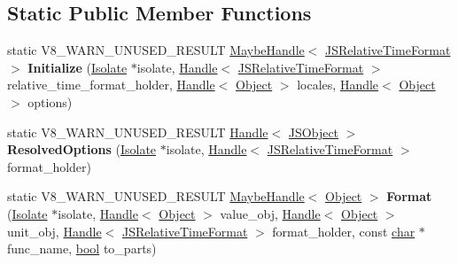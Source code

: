 \subsection*{Static Public Member Functions}
\begin{DoxyCompactItemize}
\item 
\mbox{\label{classv8_1_1internal_1_1JSRelativeTimeFormat_a203a42a386b944dc99ace43de6063f83}} 
static V8\+\_\+\+W\+A\+R\+N\+\_\+\+U\+N\+U\+S\+E\+D\+\_\+\+R\+E\+S\+U\+LT \mbox{\hyperlink{classv8_1_1internal_1_1MaybeHandle}{Maybe\+Handle}}$<$ \mbox{\hyperlink{classv8_1_1internal_1_1JSRelativeTimeFormat}{J\+S\+Relative\+Time\+Format}} $>$ {\bfseries Initialize} (\mbox{\hyperlink{classv8_1_1internal_1_1Isolate}{Isolate}} $\ast$isolate, \mbox{\hyperlink{classv8_1_1internal_1_1Handle}{Handle}}$<$ \mbox{\hyperlink{classv8_1_1internal_1_1JSRelativeTimeFormat}{J\+S\+Relative\+Time\+Format}} $>$ relative\+\_\+time\+\_\+format\+\_\+holder, \mbox{\hyperlink{classv8_1_1internal_1_1Handle}{Handle}}$<$ \mbox{\hyperlink{classv8_1_1internal_1_1Object}{Object}} $>$ locales, \mbox{\hyperlink{classv8_1_1internal_1_1Handle}{Handle}}$<$ \mbox{\hyperlink{classv8_1_1internal_1_1Object}{Object}} $>$ options)
\item 
\mbox{\label{classv8_1_1internal_1_1JSRelativeTimeFormat_aa114b19274387be61a40faa0a96ef961}} 
static V8\+\_\+\+W\+A\+R\+N\+\_\+\+U\+N\+U\+S\+E\+D\+\_\+\+R\+E\+S\+U\+LT \mbox{\hyperlink{classv8_1_1internal_1_1Handle}{Handle}}$<$ \mbox{\hyperlink{classv8_1_1internal_1_1JSObject}{J\+S\+Object}} $>$ {\bfseries Resolved\+Options} (\mbox{\hyperlink{classv8_1_1internal_1_1Isolate}{Isolate}} $\ast$isolate, \mbox{\hyperlink{classv8_1_1internal_1_1Handle}{Handle}}$<$ \mbox{\hyperlink{classv8_1_1internal_1_1JSRelativeTimeFormat}{J\+S\+Relative\+Time\+Format}} $>$ format\+\_\+holder)
\item 
\mbox{\label{classv8_1_1internal_1_1JSRelativeTimeFormat_a5919f5b4f9aed00af7ec1f83c7717faf}} 
static V8\+\_\+\+W\+A\+R\+N\+\_\+\+U\+N\+U\+S\+E\+D\+\_\+\+R\+E\+S\+U\+LT \mbox{\hyperlink{classv8_1_1internal_1_1MaybeHandle}{Maybe\+Handle}}$<$ \mbox{\hyperlink{classv8_1_1internal_1_1Object}{Object}} $>$ {\bfseries Format} (\mbox{\hyperlink{classv8_1_1internal_1_1Isolate}{Isolate}} $\ast$isolate, \mbox{\hyperlink{classv8_1_1internal_1_1Handle}{Handle}}$<$ \mbox{\hyperlink{classv8_1_1internal_1_1Object}{Object}} $>$ value\+\_\+obj, \mbox{\hyperlink{classv8_1_1internal_1_1Handle}{Handle}}$<$ \mbox{\hyperlink{classv8_1_1internal_1_1Object}{Object}} $>$ unit\+\_\+obj, \mbox{\hyperlink{classv8_1_1internal_1_1Handle}{Handle}}$<$ \mbox{\hyperlink{classv8_1_1internal_1_1JSRelativeTimeFormat}{J\+S\+Relative\+Time\+Format}} $>$ format\+\_\+holder, const \mbox{\hyperlink{classchar}{char}} $\ast$func\+\_\+name, \mbox{\hyperlink{classbool}{bool}} to\+\_\+parts)

\end{DoxyCompactItemize}
